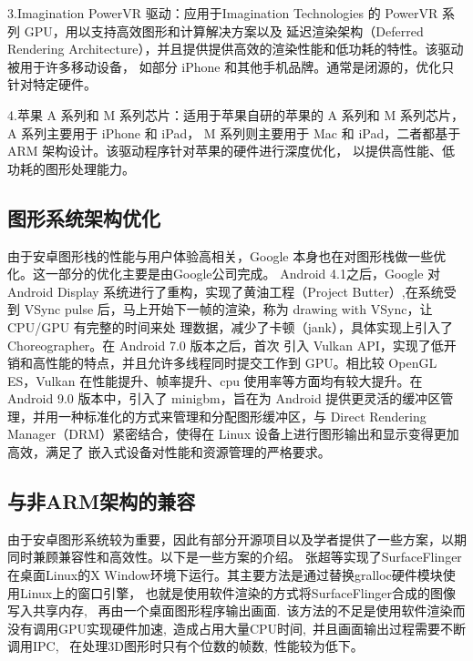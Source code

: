3.Imagination PowerVR \cite{imaginationtech}驱动：应用于Imagination Technologies 的 PowerVR 系列 GPU，用以支持高效图形和计算解决方案以及
延迟渲染架构（Deferred Rendering Architecture），并且提供提供高效的渲染性能和低功耗的特性。该驱动被用于许多移动设备，
如部分 iPhone 和其他手机品牌。通常是闭源的，优化只针对特定硬件。

4.苹果 A 系列和 M 系列芯片\cite{apple}：适用于苹果自研的苹果的 A 系列和 M 系列芯片，A 系列主要用于 iPhone 和 iPad，
M 系列则主要用于 Mac 和 iPad，二者都基于 ARM 架构设计。该驱动程序针对苹果的硬件进行深度优化，
以提供高性能、低功耗的图形处理能力。




\subsection{图形系统架构优化}
由于安卓图形栈的性能与用户体验高相关，Google 本身也在对图形栈做一些优化。这一部分的优化主要是由Google公司完成。
Android 4.1之后，Google 对 Android Display 系统进行了重构，实现了黄油工程（Project Butter）,在系统受到
VSync pulse 后，马上开始下一帧的渲染，称为 drawing with VSync，让 CPU/GPU 有完整的时间来处
理数据，减少了卡顿（jank），具体实现上引入了 Choreographer\cite{google2012dev}。在 Android 7.0 版本之后，首次
引入 Vulkan API，实现了低开销和高性能的特点，并且允许多线程同时提交工作到 GPU。相比较
OpenGL ES，Vulkan 在性能提升、帧率提升、cpu 使用率等方面均有较大提升。在Android 9.0 版本中，引入了
minigbm，旨在为 Android 提供更灵活的缓冲区管理，并用一种标准化的方式来管理和分配图形缓冲区，与 
Direct Rendering Manager（DRM）紧密结合，使得在 Linux 设备上进行图形输出和显示变得更加高效，满足了
嵌入式设备对性能和资源管理的严格要求。

\subsection{与非ARM架构的兼容}
由于安卓图形系统较为重要，因此有部分开源项目以及学者提供了一些方案，以期同时兼顾兼容性和高效性。以下是一些方案的介绍。
张超等\cite{张超2012Android}实现了SurfaceFlinger在桌面Linux的X Window环境下运行。其主要方法是通过替换gralloc硬件模块使用Linux上的窗口引擎，
也就是使用软件渲染的方式将SurfaceFlinger合成的图像写入共享内存,
 再由一个桌面图形程序输出画面. 该方法的不足是使用软件渲染而没有调用GPU实现硬件加速, 造成占用大量CPU时间, 并且画面输出过程需要不断调用IPC,
 在处理3D图形时只有个位数的帧数, 性能较为低下。

